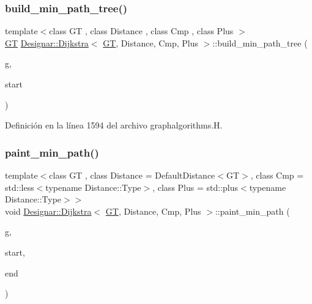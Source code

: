 \subsubsection{\texorpdfstring{build\+\_\+min\+\_\+path\+\_\+tree()}{build\_min\_path\_tree()}}
{\footnotesize\ttfamily template$<$class GT , class Distance , class Cmp , class Plus $>$ \\
\hyperlink{demo-buildgraph_8_c_a3001c40d2c31ca87ed96cd7d1334a55e}{GT} \hyperlink{class_designar_1_1_dijkstra}{Designar\+::\+Dijkstra}$<$ \hyperlink{demo-buildgraph_8_c_a3001c40d2c31ca87ed96cd7d1334a55e}{GT}, Distance, Cmp, Plus $>$\+::build\+\_\+min\+\_\+path\+\_\+tree (\begin{DoxyParamCaption}\item[{\hyperlink{demo-buildgraph_8_c_a3001c40d2c31ca87ed96cd7d1334a55e}{GT} \&}]{g,  }\item[{\hyperlink{class_designar_1_1_dijkstra_afeb644fc5395569ec366f0d220ab477d}{Node} \&}]{start }\end{DoxyParamCaption})}



Definición en la línea 1594 del archivo graphalgorithms.\+H.

\mbox{\label{class_designar_1_1_dijkstra_a103839d3bd4e6d8733d2b47b186e137a}} 
\subsubsection{\texorpdfstring{paint\+\_\+min\+\_\+path()}{paint\_min\_path()}}
{\footnotesize\ttfamily template$<$class GT , class Distance  = Default\+Distance$<$\+G\+T$>$, class Cmp  = std\+::less$<$typename Distance\+::\+Type$>$, class Plus  = std\+::plus$<$typename Distance\+::\+Type$>$$>$ \\
void \hyperlink{class_designar_1_1_dijkstra}{Designar\+::\+Dijkstra}$<$ \hyperlink{demo-buildgraph_8_c_a3001c40d2c31ca87ed96cd7d1334a55e}{GT}, Distance, Cmp, Plus $>$\+::paint\+\_\+min\+\_\+path (\begin{DoxyParamCaption}\item[{\hyperlink{demo-buildgraph_8_c_a3001c40d2c31ca87ed96cd7d1334a55e}{GT} \&}]{g,  }\item[{\hyperlink{class_designar_1_1_dijkstra_afeb644fc5395569ec366f0d220ab477d}{Node} \&}]{start,  }\item[{\hyperlink{class_designar_1_1_dijkstra_afeb644fc5395569ec366f0d220ab477d}{Node} \&}]{end }\end{DoxyParamCaption})\hspace{0.3cm}{\ttfamily [inline]}}



